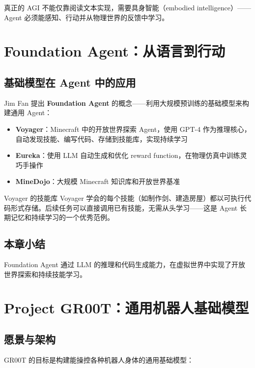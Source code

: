\documentclass[a4paper]{article}
\begin{document}
真正的 AGI 不能仅靠阅读文本实现，需要具身智能（embodied intelligence）——Agent 必须能感知、行动并从物理世界的反馈中学习。

\section{Foundation Agent：从语言到行动}

\subsection{基础模型在 Agent 中的应用}

Jim Fan 提出 \textbf{Foundation Agent} 的概念——利用大规模预训练的基础模型来构建通用 Agent：

\begin{itemize}
    \item \textbf{Voyager}：Minecraft 中的开放世界探索 Agent，使用 GPT-4 作为推理核心，自动发现技能、编写代码、存储到技能库，实现持续学习
    \item \textbf{Eureka}：使用 LLM 自动生成和优化 reward function，在物理仿真中训练灵巧手操作
    \item \textbf{MineDojo}：大规模 Minecraft 知识库和开放世界基准
\end{itemize}

\begin{knowledgebox}{Voyager 的技能库}
Voyager 学会的每个技能（如制作剑、建造房屋）都以可执行代码形式存储。后续任务可以直接调用已有技能，无需从头学习——这是 Agent 长期记忆和持续学习的一个优秀范例。
\end{knowledgebox}

\subsection{本章小结}

Foundation Agent 通过 LLM 的推理和代码生成能力，在虚拟世界中实现了开放世界探索和持续技能学习。

\section{Project GR00T：通用机器人基础模型}

\subsection{愿景与架构}

GR00T 的目标是构建能操控各种机器人身体的通用基础模型：
\end{document}
